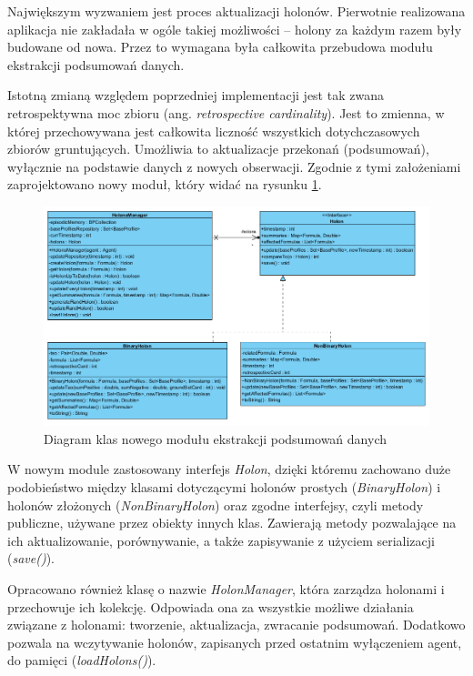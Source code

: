 Największym wyzwaniem jest proces aktualizacji holonów. Pierwotnie realizowana aplikacja nie zakładała w ogóle takiej możliwości -- holony za każdym razem były budowane od nowa. Przez to wymagana była całkowita przebudowa modułu ekstrakcji podsumowań danych.

Istotną zmianą względem poprzedniej implementacji jest tak zwana retrospektywna moc zbioru (ang. \textit{retrospective cardinality}). Jest to zmienna, w której przechowywana jest całkowita liczność wszystkich dotychczasowych zbiorów gruntujących. Umożliwia to aktualizacje przekonań (podsumowań), wyłącznie na podstawie danych z nowych obserwacji. Zgodnie z tymi założeniami zaprojektowano nowy moduł, który widać na rysunku \ref{rys:diagram-klas}.

\begin{figure}  
	\centering\includegraphics[width=\textwidth]{img/diagram-klas}
	\caption{Diagram klas nowego modułu ekstrakcji podsumowań danych}
	\label{rys:diagram-klas}
\end{figure}

W nowym module zastosowany interfejs \textit{Holon}, dzięki któremu zachowano duże podobieństwo między klasami dotyczącymi holonów prostych (\textit{BinaryHolon}) i holonów złożonych (\textit{NonBinaryHolon}) oraz zgodne interfejsy, czyli metody publiczne, używane przez obiekty innych klas. Zawierają metody pozwalające na ich aktualizowanie, porównywanie, a także zapisywanie z użyciem serializacji (\textit{save()}).

Opracowano również klasę o nazwie \textit{HolonManager}, która zarządza holonami i przechowuje ich kolekcję. Odpowiada ona za wszystkie możliwe działania związane z holonami: tworzenie, aktualizacja, zwracanie podsumowań. Dodatkowo pozwala na wczytywanie holonów, zapisanych przed ostatnim wyłączeniem agent, do pamięci (\textit{loadHolons()}).

